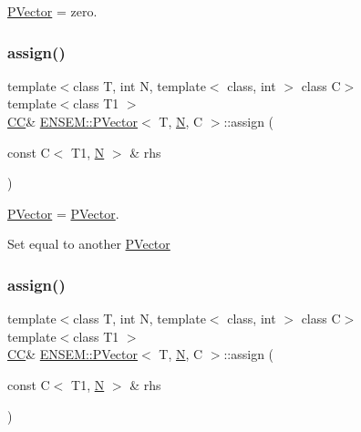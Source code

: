 \mbox{\hyperlink{classENSEM_1_1PVector}{P\+Vector}} = zero. 

\mbox{\label{classENSEM_1_1PVector_ab908e56421fdbff29813fb8bdaecdb6f}} 
\subsubsection{\texorpdfstring{assign()}{assign()}\hspace{0.1cm}{\footnotesize\ttfamily [3/4]}}
{\footnotesize\ttfamily template$<$class T, int N, template$<$ class, int $>$ class C$>$ \\
template$<$class T1 $>$ \\
\mbox{\hyperlink{classENSEM_1_1PVector_a92dc0a0a301a3dc96f7be5d337019bc7}{CC}}\& \mbox{\hyperlink{classENSEM_1_1PVector}{E\+N\+S\+E\+M\+::\+P\+Vector}}$<$ T, \mbox{\hyperlink{operator__name__util_8cc_a7722c8ecbb62d99aee7ce68b1752f337}{N}}, C $>$\+::assign (\begin{DoxyParamCaption}\item[{const C$<$ T1, \mbox{\hyperlink{operator__name__util_8cc_a7722c8ecbb62d99aee7ce68b1752f337}{N}} $>$ \&}]{rhs }\end{DoxyParamCaption})\hspace{0.3cm}{\ttfamily [inline]}}



\mbox{\hyperlink{classENSEM_1_1PVector}{P\+Vector}} = \mbox{\hyperlink{classENSEM_1_1PVector}{P\+Vector}}. 

Set equal to another \mbox{\hyperlink{classENSEM_1_1PVector}{P\+Vector}} \mbox{\label{classENSEM_1_1PVector_ab908e56421fdbff29813fb8bdaecdb6f}} 
\subsubsection{\texorpdfstring{assign()}{assign()}\hspace{0.1cm}{\footnotesize\ttfamily [4/4]}}
{\footnotesize\ttfamily template$<$class T, int N, template$<$ class, int $>$ class C$>$ \\
template$<$class T1 $>$ \\
\mbox{\hyperlink{classENSEM_1_1PVector_a92dc0a0a301a3dc96f7be5d337019bc7}{CC}}\& \mbox{\hyperlink{classENSEM_1_1PVector}{E\+N\+S\+E\+M\+::\+P\+Vector}}$<$ T, \mbox{\hyperlink{operator__name__util_8cc_a7722c8ecbb62d99aee7ce68b1752f337}{N}}, C $>$\+::assign (\begin{DoxyParamCaption}\item[{const C$<$ T1, \mbox{\hyperlink{operator__name__util_8cc_a7722c8ecbb62d99aee7ce68b1752f337}{N}} $>$ \&}]{rhs }\end{DoxyParamCaption})\hspace{0.3cm}{\ttfamily [inline]}}



